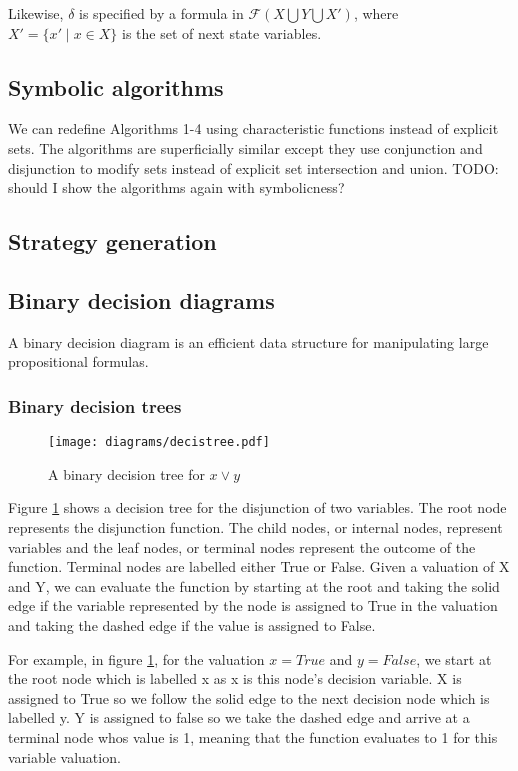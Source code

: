 \documentclass{book}
\newcommand{\forms}[0]{\mathcal{F}}
\theoremstyle{definition}
\begin{document}
Likewise, $\delta$ is specified by a formula in $\forms(X \bigcup Y \bigcup X')$, where $X' = \{x' \mid x \in X \}$ is the set of next state variables.

\subsection{Symbolic algorithms}

We can redefine Algorithms 1-4 using characteristic functions instead of explicit sets. The algorithms are superficially similar except they use conjunction and disjunction to modify sets instead of explicit set intersection and union. TODO: should I show the algorithms again with symbolicness?

\subsection{Strategy generation}
\subsection{Binary decision diagrams}

A binary decision diagram is an efficient data structure for manipulating large propositional formulas. 

\subsubsection{Binary decision trees}

\begin{figure}[t]
\centering
\texttt{[image: diagrams/decistree.pdf]}
\caption{A binary decision tree for $x \vee y$}
\label{fig:decis_tree}
\end{figure}

Figure \ref{fig:decis_tree} shows a decision tree for the disjunction of two variables. The root node represents the disjunction function. The child nodes, or internal nodes, represent variables and the leaf nodes, or terminal nodes represent the outcome of the function. Terminal nodes are labelled either True or False. Given a valuation of X and Y, we can evaluate the function by starting at the root and taking the solid edge if the variable represented by the node is assigned to True in the valuation and taking the dashed edge if the value is assigned to False. 

For example, in figure \ref{fig:decis_tree}, for the valuation $x=True$ and $y=False$, we start at the root node which is labelled x as x is this node's decision variable. X is assigned to True so we follow the solid edge to the next decision node which is labelled y. Y is assigned to false so we take the dashed edge and arrive at a terminal node whos value is 1, meaning that the function evaluates to 1 for this variable valuation.
\end{document}
